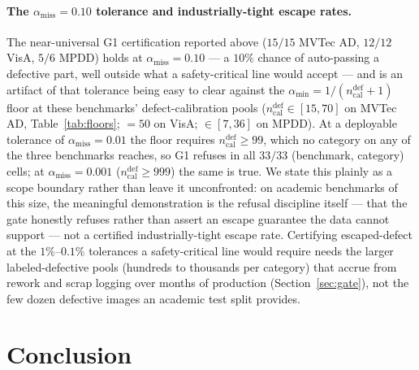 \documentclass[11pt]{article}
\begin{document}
\paragraph{The $\alpha_{\text{miss}}=0.10$ tolerance and industrially-tight escape rates.} The
near-universal G1 certification reported above ($15/15$ MVTec AD, $12/12$ VisA, $5/6$ MPDD) holds
at $\alpha_{\text{miss}}=0.10$ --- a $10\%$ chance of auto-passing a defective part, well outside
what a safety-critical line would accept --- and is an artifact of that tolerance being easy to
clear against the $\alpha_{\min}=1/(n_{\text{cal}}^{\text{def}}+1)$ floor at these benchmarks'
defect-calibration pools ($n_{\text{cal}}^{\text{def}}\in[15,70]$ on MVTec AD,
Table~\ref{tab:floors}; $=50$ on VisA; $\in[7,36]$ on MPDD). At a deployable tolerance of
$\alpha_{\text{miss}}=0.01$ the floor requires $n_{\text{cal}}^{\text{def}}\ge 99$, which no
category on any of the three benchmarks reaches, so G1 refuses in all $33/33$ (benchmark,
category) cells; at $\alpha_{\text{miss}}=0.001$ ($n_{\text{cal}}^{\text{def}}\ge 999$) the same
is true. We state this plainly as a scope boundary rather than leave it unconfronted: on academic
benchmarks of this size, the meaningful demonstration is the refusal discipline itself --- that
the gate honestly refuses rather than assert an escape guarantee the data cannot support --- not a
certified industrially-tight escape rate. Certifying escaped-defect at the $1\%$--$0.1\%$
tolerances a safety-critical line would require needs the larger labeled-defective pools (hundreds
to thousands per category) that accrue from rework and scrap logging over months of production
(Section~\ref{sec:gate}), not the few dozen defective images an academic test split provides.

\section{Conclusion}
\label{sec:conclusion}
\end{document}
